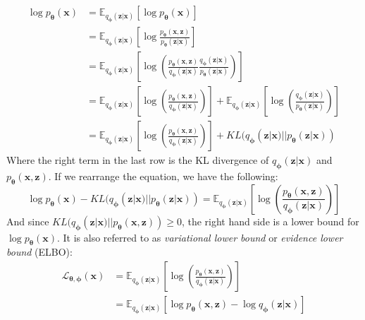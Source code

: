\documentclass[12pt]{report}
\theoremstyle{definition}
\begin{document}
\begin{equation}
\begin{split}
	\log p_{\pmb{\theta}}(\mathbf{x})
	& = \mathbb{E}_{q_{\pmb{\phi}}(\mathbf{z}|\mathbf{x})}\left[\log p_{\pmb{\theta}}(\mathbf{x})\right] \\
	& = \mathbb{E}_{q_{\pmb{\phi}}(\mathbf{z}|\mathbf{x})}\left[ \log \frac{p_{\pmb{\theta}}(\mathbf{x}, \mathbf{z})}{p_{\pmb{\theta}}(\mathbf{z}|\mathbf{x})} \right] \\
	& = \mathbb{E}_{q_{\pmb{\phi}}(\mathbf{z}|\mathbf{x})}\left[ \log\left(\frac{p_{\pmb{\theta}}(\mathbf{x}, \mathbf{z})}{q_{\pmb{\phi}}(\mathbf{z}|\mathbf{x})}\frac{q_{\pmb{\phi}}(\mathbf{z}|\mathbf{x})}{p_{\pmb{\theta}}(\mathbf{z}|\mathbf{x})} \right) \right] \\
	& = \mathbb{E}_{q_{\pmb{\phi}}(\mathbf{z}|\mathbf{x})}\left[ \log\left(\frac{p_{\pmb{\theta}}(\mathbf{x}, \mathbf{z})}{q_{\pmb{\phi}}(\mathbf{z}|\mathbf{x})}\right) \right] + \mathbb{E}_{q_{\pmb{\phi}}(\mathbf{z}|\mathbf{x})}\left[ \log\left(\frac{q_{\pmb{\phi}}(\mathbf{z}|\mathbf{x})}{p_{\pmb{\theta}}(\mathbf{z}|\mathbf{x})} \right) \right] \\
	& = \mathbb{E}_{q_{\pmb{\phi}}(\mathbf{z}|\mathbf{x})}\left[ \log\left(\frac{p_{\pmb{\theta}}(\mathbf{x}, \mathbf{z})}{q_{\pmb{\phi}}(\mathbf{z}|\mathbf{x})}\right) \right] + KL(q_{\pmb{\phi}}(\mathbf{z}|\mathbf{x}) || p_{\pmb{\theta}}(\mathbf{z}| \mathbf{x}))
\end{split}
\end{equation}
Where the right term in the last row is the KL divergence of $q_{\pmb{\phi}}(\mathbf{z}|\mathbf{x})$ and $p_{\pmb{\theta}}(\mathbf{x}, \mathbf{z})$. If we rearrange the equation, we have the following:
\begin{equation}
	\log p_{\pmb{\theta}}(\mathbf{x}) - KL(q_{\pmb{\phi}}(\mathbf{z}|\mathbf{x}) || p_{\pmb{\theta}}(\mathbf{z}| \mathbf{x})) = \mathbb{E}_{q_{\pmb{\phi}}(\mathbf{z}|\mathbf{x})}\left[ \log\left(\frac{p_{\pmb{\theta}}(\mathbf{x}, \mathbf{z})}{q_{\pmb{\phi}}(\mathbf{z}|\mathbf{x})}\right) \right]
\end{equation}
And since $KL(q_{\pmb{\phi}}(\mathbf{z}|\mathbf{x}) || p_{\pmb{\theta}}(\mathbf{x}, \mathbf{z})) \geq 0$, the right hand side is a lower bound for $\log p_{\pmb{\theta}}(\mathbf{x})$. It is also referred to as \emph{variational lower bound} or \emph{evidence lower bound} (ELBO):
\begin{equation}
\begin{split}
	\mathcal{L}_{\pmb{\theta}, \pmb{\phi}}(\mathbf{x})
	& = \mathbb{E}_{q_{\pmb{\phi}}(\mathbf{z}|\mathbf{x})}\left[ \log\left(\frac{p_{\pmb{\theta}}(\mathbf{x}, \mathbf{z})}{q_{\pmb{\phi}}(\mathbf{z}|\mathbf{x})}\right) \right] \\
	& = \mathbb{E}_{q_{\pmb{\phi}}(\mathbf{z}|\mathbf{x})}\left[ \log p_{\pmb{\theta}}(\mathbf{x}, \mathbf{z}) - \log q_{\pmb{\phi}}(\mathbf{z}|\mathbf{x}) \right] \\\\
\end{split}
\end{equation}
\end{document}
